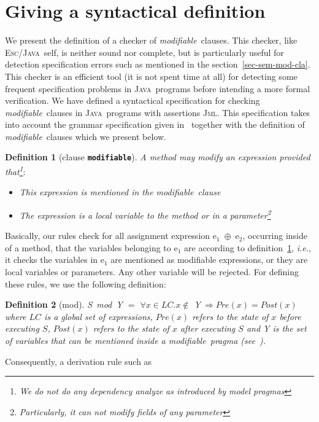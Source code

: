 \documentclass[a4paper]{llncs}
\newcommand{\jml}{\textsc{Jml}}
\newcommand{\escj}{\textsc{Esc/Java}}
\newcommand{\java}{\textsc{Java}}
\newcommand{\modif}{\textit{modifiable}}
\newtheorem {df}{Definition}
\begin{document}
\section{Giving a syntactical definition}
\label{sec-giv-sin-def}
We present the definition of a checker of \modif~clauses. This
checker, like \escj~self, is neither sound nor complete, but is
particularly useful for detection specification errors such as
mentioned in the section~\ref{sec-sem-mod-cla}. This checker is an
efficient tool
(it is not spent time at all) for detecting some frequent
specification
problems in \java~programs before intending a more formal
verification. We have defined a syntactical specification for checking
\modif~clauses in \java~programs with assertions \jml. This
specification takes into account the grammar specification
given in~\cite{LBR00} together with the definition of \modif~clauses
which we present below.
\begin{df}[clause {\tt \bf modifiable}]
\label{def-mod}
A method may modify an expression provided that\footnote{We do not do
any dependency analyze as introduced by \emph{model} pragmas}$:$ 
\begin{itemize}
\item This expression is mentioned in the \modif~clause
\item The expression is a local variable to the method or in a
parameter\footnote{Particularly, it can not modify fields of any
parameter}
\end{itemize}
\end{df}
Basically, our rules check for all assignment expression \textup{e}$_1$\
$\oplus$\ \textup{e}$_2$, occurring inside of a
method, that the variables belonging to \textup{e}$_1$ are
according to definition~\ref{def-mod}, \emph{i.e.}, it checks the
variables in \textup{e}$_1$ are mentioned as modifiable expressions,
or they are local variables or parameters. Any other variable
will
be rejected. For defining these rules, we use the
following definition$:$
\begin{df}[mod]
\textup{S}\ \textit{mod}\ \textsc{Y} $=$ $\forall x \in LC.
x\not\in$ \textsc{Y}$\ \Rightarrow Pre(x) = Post(x)$ \\
where $LC$ is a global set of expressions, $Pre(x)$
refers to the state of $x$ before executing $S$,
$Post(x)$ refers to the state of $x$ after executing
$S$ and \textsc{Y} is the set of variables that can be mentioned
inside a \modif~pragma (see~\cite{LBR00}).
\end{df}
Consequently, a derivation rule such as \\
\end{document}
